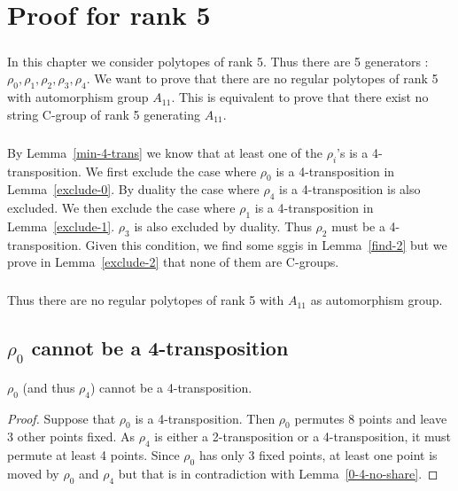 \chapter{Proof for rank 5}

\paragraph{}
In this chapter we consider polytopes of rank 5. Thus there are 5 generators : $\rho_0, \rho_1, \rho_2, \rho_3, \rho_4$. We want to prove that there are no regular polytopes of rank 5 with automorphism group $A_{11}$. This is equivalent to prove that there exist no string C-group of rank 5 generating $A_{11}$.

\paragraph{}
By Lemma~\ref{min-4-trans} we know that at least one of the $\rho_i$'s is a 4-transposition. We first exclude the case where $\rho_0$ is a 4-transposition in Lemma~\ref{exclude-0}. By duality the case where $\rho_4$ is a 4-transposition is also excluded. We then exclude the case where $\rho_1$ is a 4-transposition in Lemma~\ref{exclude-1}. $\rho_3$ is also excluded by duality. Thus $\rho_2$ must be a 4-transposition. Given this condition, we find some sggis in Lemma~\ref{find-2} but we prove in Lemma~\ref{exclude-2} that none of them are C-groups.

\paragraph{}
Thus there are no regular polytopes of rank 5 with $A_{11}$ as automorphism group.

\section{$\rho_0$ cannot be a 4-transposition}

\begin{lemma}
  \label{exclude-0}
  $\rho_0$ (and thus $\rho_4$) cannot be a 4-transposition.
\end{lemma}

\begin{proof}
  Suppose that $\rho_0$ is a 4-transposition. Then $\rho_0$ permutes 8 points and leave 3 other points fixed. As $\rho_4$ is either a 2-transposition or a 4-transposition, it must permute at least 4 points. Since $\rho_0$ has only 3 fixed points, at least one point is moved by $\rho_0$ and $\rho_4$ but that is in contradiction with Lemma~\ref{0-4-no-share}.
\end{proof}
